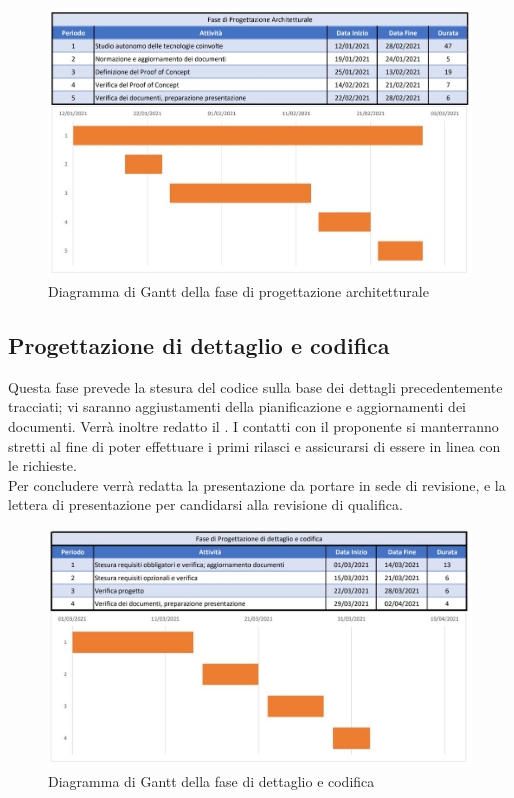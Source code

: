 \documentclass[../piano_di_progetto.tex]{subfiles}
\begin{document}
\begin{figure}[H]
\centering

\includegraphics[width=12cm]{componenti/img/fase_prog_archit}

\caption{Diagramma di Gantt della fase di progettazione architetturale}
\end{figure}


\subsection{Progettazione di dettaglio e codifica}%
\label{sub:prog_dett}
Questa fase prevede la stesura del codice sulla base dei dettagli precedentemente tracciati; vi saranno aggiustamenti della pianificazione e aggiornamenti dei documenti. Verrà inoltre redatto il . I contatti con il proponente si manterranno stretti al fine di poter effettuare i primi rilasci e assicurarsi di essere in linea con le richieste.\\
Per concludere verrà redatta la presentazione da portare in sede di revisione, e la lettera di presentazione per candidarsi alla revisione di qualifica. 

\begin{figure}[H]
\centering

\includegraphics[width=12cm]{componenti/img/fase_dett_cod}

\caption{Diagramma di Gantt della fase di dettaglio e codifica}
\end{figure}
\end{document}
